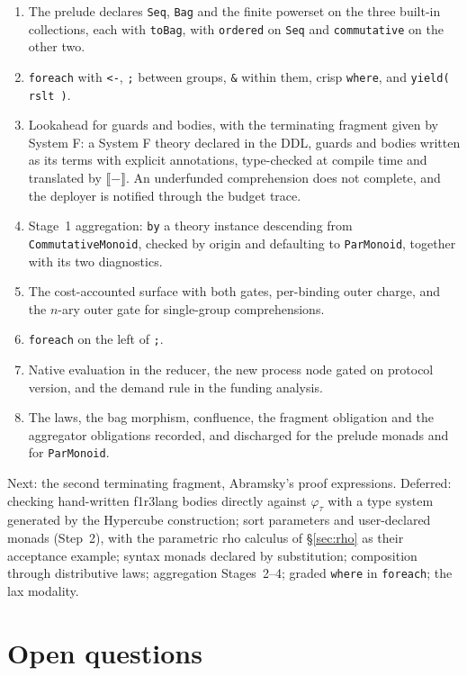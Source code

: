 \documentclass[11pt]{article}
\theoremstyle{branddef}
\theoremstyle{brandplain}
\theoremstyle{brandrem}
\newcommand{\rhoc}{\textsf{rho}}
\newcommand{\sem}[1]{\llbracket #1 \rrbracket}
\newcommand{\fe}{\texttt{foreach}}
\newcommand{\flang}{\textsf{f1r3lang}}
\begin{document}
\begin{enumerate}[nosep]
\item The prelude declares \texttt{Seq}, \texttt{Bag} and the finite powerset on
the three built-in collections, each with \texttt{toBag}, with
\texttt{ordered} on \texttt{Seq} and \texttt{commutative} on the other two.
\item \fe{} with \texttt{<-}, \texttt{;} between groups, \texttt{\&} within
them, crisp \texttt{where}, and \texttt{yield( rslt )}.
\item Lookahead for guards and bodies, with the terminating fragment given by
System F: a System F theory declared in the DDL, guards and bodies written as its
terms with explicit annotations, type-checked at compile time and translated by
\(\sem{-}\). An underfunded comprehension does not complete, and the deployer
is notified through the budget trace.
\item Stage~1 aggregation: \texttt{by} a theory instance descending from
\texttt{CommutativeMonoid}, checked by origin and defaulting to
\texttt{ParMonoid}, together with its two diagnostics.
\item The cost-accounted surface with both gates, per-binding outer charge, and
the \(n\)-ary outer gate for single-group comprehensions.
\item \fe{} on the left of \texttt{;}.
\item Native evaluation in the reducer, the new process node gated on protocol
version, and the demand rule in the funding analysis.
\item The laws, the bag morphism, confluence, the fragment obligation and the
aggregator obligations recorded, and discharged for the prelude monads and for
\texttt{ParMonoid}.
\end{enumerate}

\noindent
Next: the second terminating fragment, Abramsky's proof expressions.
Deferred: checking hand-written \flang{} bodies directly against
\(\varphi_\tau\) with a type system generated by the Hypercube construction;
sort parameters and user-declared monads (Step~2), with the
parametric \rhoc{} calculus of \S\ref{sec:rho} as their acceptance example;
syntax monads declared by substitution; composition through distributive laws;
aggregation Stages~2--4; graded \texttt{where} in \fe{}; the lax modality.

\section{Open questions}
\label{sec:questions}
\end{document}
